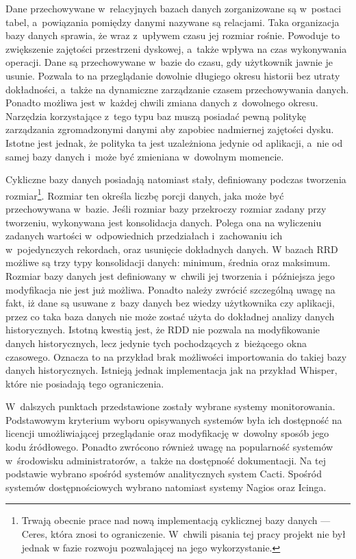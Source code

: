 Dane przechowywane w~relacyjnych bazach danych zorganizowane są
w~postaci tabel, a~powiązania pomiędzy danymi nazywane są
relacjami. Taka organizacja bazy danych sprawia, że wraz z~upływem
czasu jej rozmiar rośnie. Powoduje to zwiększenie zajętości
przestrzeni dyskowej, a~także wpływa na czas wykonywania
operacji. Dane są przechowywane w~bazie do czasu, gdy użytkownik
jawnie je usunie. Pozwala to na przeglądanie dowolnie długiego okresu
historii bez utraty dokładności, a~także na dynamiczne zarządzanie
czasem przechowywania danych. Ponadto możliwa jest w~każdej chwili
zmiana danych z~dowolnego okresu. Narzędzia korzystające z~tego typu
baz muszą posiadać pewną politykę zarządzania zgromadzonymi danymi aby
zapobiec nadmiernej zajętości dysku. Istotne jest jednak, że polityka
ta jest uzależniona jedynie od aplikacji, a~nie od samej bazy danych
i~może być zmieniana w~dowolnym momencie.

Cykliczne bazy danych posiadają natomiast stały, definiowany podczas
tworzenia rozmiar\footnote{Trwają obecnie prace nad nową implementacją
  cyklicznej bazy danych --- Ceres\cite{www:Ceres}, która znosi to
  ograniczenie. W~chwili pisania tej pracy projekt nie był jednak w
  fazie rozwoju pozwalającej na jego wykorzystanie.}. Rozmiar ten
określa liczbę porcji danych, jaka może być przechowywana
w~bazie. Jeśli rozmiar bazy przekroczy rozmiar zadany przy tworzeniu,
wykonywana jest konsolidacja danych. Polega ona na wyliczeniu zadanych
wartości w~odpowiednich przedziałach i~zachowaniu ich w~pojedynczych
rekordach, oraz usunięcie dokładnych danych. W bazach RRD możliwe są
trzy typy konsolidacji danych: minimum, średnia oraz maksimum. Rozmiar
bazy danych jest definiowany w~chwili jej tworzenia i~późniejsza jego
modyfikacja nie jest już możliwa. Ponadto należy zwrócić szczególną
uwagę na fakt, iż dane są usuwane z~bazy danych bez wiedzy użytkownika
czy aplikacji, przez co taka baza danych nie może zostać użyta do
dokładnej analizy danych historycznych. Istotną kwestią jest, że RDD
nie pozwala na modyfikowanie danych historycznych, lecz jedynie tych
pochodzących z~bieżącego okna czasowego. Oznacza to na przykład brak
możliwości importowania do takiej bazy danych historycznych. Istnieją
jednak implementacja jak na przykład Whisper, które nie posiadają tego
ograniczenia.

W~dalszych punktach przedstawione zostały wybrane systemy
monitorowania. Podstawowym kryterium wyboru opisywanych systemów była
ich dostępność na licencji umożliwiającej przeglądanie oraz
modyfikację w~dowolny sposób jego kodu źródłowego. Ponadto zwrócono
również uwagę na popularność systemów w~środowisku administratorów,
a~także na dostępność dokumentacji. Na tej podstawie wybrano spośród
systemów analitycznych system Cacti. Spośród systemów dostępnościowych
wybrano natomiast systemy Nagios oraz Icinga.


